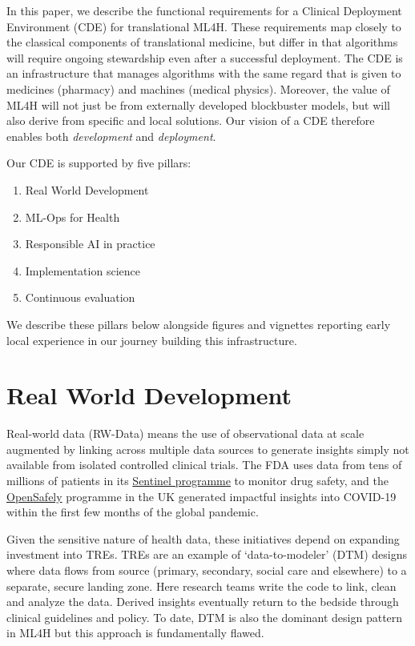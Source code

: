 In this paper, we describe the functional requirements for a Clinical
Deployment Environment (CDE) for translational ML4H. These requirements
map closely to the classical components of translational medicine, but
differ in that algorithms will require ongoing stewardship even after a
successful deployment. The CDE is an infrastructure that manages
algorithms with the same regard that is given to medicines (pharmacy)
and machines (medical physics). Moreover, the value of ML4H will not
just be from externally developed blockbuster models, but will also
derive from specific and local solutions. Our vision of a CDE therefore
enables both \emph{development} and \emph{deployment}.

Our CDE is supported by five pillars:

\begin{enumerate}
\def\labelenumi{\arabic{enumi}.}
\tightlist
\item
  Real World Development
\item
  ML-Ops for Health
\item
  Responsible AI in practice
\item
  Implementation science
\item
  Continuous evaluation
\end{enumerate}

We describe these pillars below alongside figures and vignettes
reporting early local experience in our journey building this
infrastructure.

\hypertarget{real-world-development}{%
\section{Real World Development}\label{real-world-development}}

Real-world data (RW-Data) means the use of observational data at scale
augmented by linking across multiple data sources to generate insights
simply not available from isolated controlled clinical
trials.\citep{corrigan-curay2018a} The FDA uses data from tens of
millions of patients in its
\href{https://www.sentinelinitiative.org}{Sentinel programme} to monitor
drug safety, and the \href{https://www.opensafely.org}{OpenSafely}
programme in the UK generated impactful insights into COVID-19 within
the first few months of the global pandemic.\citep{williamson2020}

Given the sensitive nature of health data, these initiatives depend on
expanding investment into TREs. \citep{2021c} TREs are an example of
`data-to-modeler' (DTM) designs where data flows from source (primary,
secondary, social care and elsewhere) to a separate, secure landing
zone. Here research teams write the code to link, clean and analyze the
data. Derived insights eventually return to the bedside through clinical
guidelines and policy. To date, DTM is also the dominant design pattern
in ML4H but this approach is fundamentally flawed.

